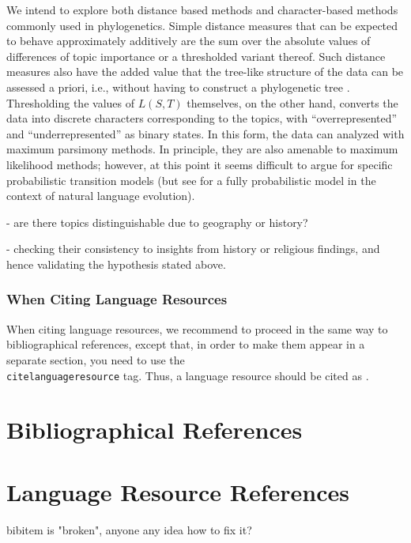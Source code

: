 \documentclass[a4paper,10pt]{article}
\newcommand{\TODO}[1]{\begingroup\color{red}#1\endgroup}
\begin{document}
We intend to explore both distance based methods and character-based methods commonly 
used in phylogenetics. Simple distance measures that can be expected to behave approximately
additively are the sum over the absolute values of differences of topic importance or a 
thresholded variant thereof. Such distance measures also have the added value that the 
tree-like structure of the data can be assessed a priori, i.e., without having to construct 
a phylogenetic tree \cite{Misof:14}. Thresholding the values of $L(S,T)$ themselves, on the other 
hand, converts the data into discrete characters corresponding to the topics, with 
``overrepresented'' and ``underrepresented''  as binary states. In this form, the data can 
analyzed with maximum parsimony methods. In principle, they are also amenable to maximum 
likelihood methods; however, at this point it seems difficult to argue for specific 
probabilistic transition models (but see \cite{Hruschka:15} for a fully probabilistic model in 
the context of natural language evolution).



\TODO{- are there topics distinguishable due to geography or history?}

\TODO{- checking their consistency to insights from history or religious findings, and hence validating the hypothesis stated above.}

\subsubsection{When Citing Language Resources}

When citing language resources, we recommend to proceed in the same way to
bibliographical references, except that, in order to make them appear in
a separate section, you need to use the \texttt{\\citelanguageresource} tag.
Thus, a language resource should be cited as .



\section{Bibliographical References}
\label{main:ref}





\section{Language Resource References}
\label{lr:ref}
\TODO{bibitem is "broken", anyone any idea how to fix it?}
\end{document}
